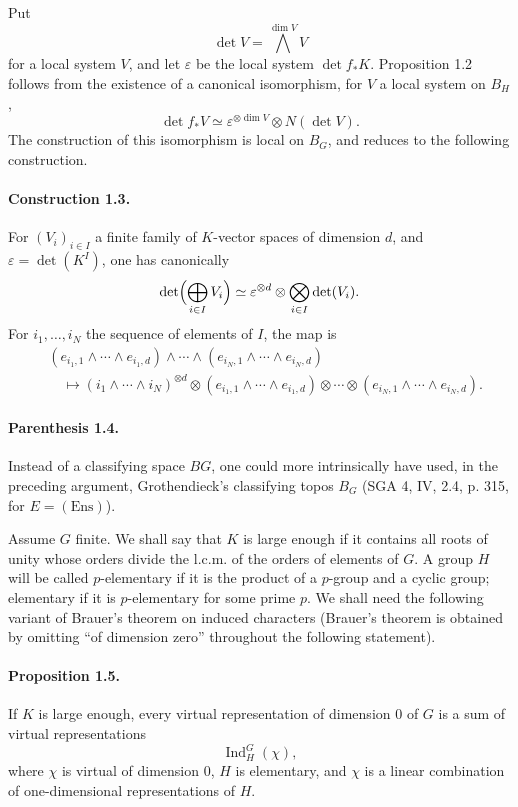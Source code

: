 \documentclass[10pt,letterpaper]{article}
\newcommand{\Ind}{\operatorname{Ind}}
\providecommand{\Ind}{\operatorname{Ind}}
\begin{document}
Put
\[
\det V=\bigwedge^{\dim V}V
\]
for a local system \(V\), and let \(\varepsilon\) be the local system \(\det f_*K\). Proposition 1.2 follows from the existence of a canonical isomorphism, for \(V\) a local system on \(B_H\),
\[
\det f_*V\simeq \varepsilon^{\otimes\dim V}\otimes N(\det V).
\]
The construction of this isomorphism is local on \(B_G\), and reduces to the following construction.

\paragraph{Construction 1.3.} For \((V_i)_{i\in I}\) a finite family of \(K\)-vector spaces of dimension \(d\), and \(\varepsilon=\det(K^I)\), one has canonically
\[
\det\Bigl(\bigoplus_{i\in I}V_i\Bigr)\simeq
\varepsilon^{\otimes d}\otimes\bigotimes_{i\in I}\det(V_i).
\]
For \(i_1,\ldots,i_N\) the sequence of elements of \(I\), the map is
\[
\begin{aligned}
&(e_{i_1,1}\wedge\cdots\wedge e_{i_1,d})\wedge\cdots\wedge
(e_{i_N,1}\wedge\cdots\wedge e_{i_N,d}) \\
&\quad\longmapsto
(i_1\wedge\cdots\wedge i_N)^{\otimes d}\otimes
(e_{i_1,1}\wedge\cdots\wedge e_{i_1,d})\otimes\cdots\otimes
(e_{i_N,1}\wedge\cdots\wedge e_{i_N,d}).
\end{aligned}
\]

\paragraph{Parenthesis 1.4.} Instead of a classifying space \(BG\), one could more intrinsically have used, in the preceding argument, Grothendieck's classifying topos \(B_G\) (SGA 4, IV, 2.4, p. 315, for \(E=(\mathrm{Ens})\)).

Assume \(G\) finite. We shall say that \(K\) is large enough if it contains all roots of unity whose orders divide the l.c.m. of the orders of elements of \(G\). A group \(H\) will be called \(p\)-elementary if it is the product of a \(p\)-group and a cyclic group; elementary if it is \(p\)-elementary for some prime \(p\). We shall need the following variant of Brauer's theorem on induced characters (Brauer's theorem is obtained by omitting ``of dimension zero'' throughout the following statement).

\paragraph{Proposition 1.5.} If \(K\) is large enough, every virtual representation of dimension \(0\) of \(G\) is a sum of virtual representations
\[
\Ind_H^G(\chi),
\]
where \(\chi\) is virtual of dimension \(0\), \(H\) is elementary, and \(\chi\) is a linear combination of one-dimensional representations of \(H\).
\end{document}
